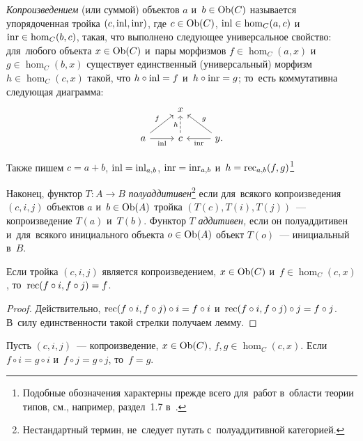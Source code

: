 \documentclass[a4paper,oneside]{article}
\newcommand{\notewrap}[1]{(#1)}
\begin{document}
\textit{Копроизведением} (или суммой) объектов $a$ и~$b \in \mathrm{Ob}(C)$ называется упорядоченная тройка $(c, \mathrm{inl}, \mathrm{inr})$,
где $c \in \mathrm{Ob}(C)$, $\mathrm{inl} \in \hom_C(a, c)$ и~$\mathrm{inr} \in \hom_C(b, c)$, такая, что
выполнено следующее универсальное свойство: для~любого объекта $x \in \mathrm{Ob}(C)$ и~пары морфизмов $f \in \hom_C(a, x)$
и~$g \in \hom_C(b, x)$ существует единственный (универсальный) морфизм $h \in \hom_C(c, x)$ такой, что $h \circ \mathrm{inl} = f$
и~$h \circ \mathrm{inr} = g$; то~есть коммутативна следующая диаграмма:
\[
  \begin{tikzcd}
    & x & \\ a \arrow{r}{}[swap]{\inl} \arrow{ur}{f} & \arrow[dashed]{u}{h} c & \arrow{l}{\inr}[swap]{} \arrow{ul}{}[swap]{g} y.
  \end{tikzcd}
\]

Также пишем $c = a + b$, $\mathrm{inl} = \mathrm{inl}_{a, b}$, $\mathrm{inr} = \mathrm{inr}_{a, b}$ и~$h = \mathrm{rec}_{a, b}(f, g)$\footnote{
  Подобные обозначения характерны прежде всего для~работ в~области теории типов, см., например, раздел~1.7 в~\cite{HoTTbook}.
  \vspace{7pt} %
}

Наконец, функтор $T : A \rightarrow B$ \textit{полуаддитивен}\rlap{\textit{,}}\footnote{
  Нестандартный термин, не~следует путать с~полуаддитивной категорией.
} если для~всякого копроизведения $(c, i, j)$ объектов $a$ и~$b \in \mathrm{Ob}(A)$
тройка $(T(c), T(i), T(j))$~— копроизведение $T(a)$ и~$T(b)$. Функтор $T$ \textit{аддитивен,} если он полуаддитивен и~для~всякого инициального объекта
$o \in \mathrm{Ob}(A)$ объект $T(o)$~— инициальный в~$B$.

\begin{lemma*}[\notewrap{$\eta$-правило}]
  Если тройка $(c, i, j)$ является копроизведением, $x \in \mathrm{Ob}(C)$
  и~$f \in \hom_C(c,\allowbreak x)$, то~$\mathrm{rec}(f \circ i, f \circ j) = f$.
\end{lemma*}

\begin{proof}
  Действительно, $\mathrm{rec}(f \circ i, f \circ j) \circ i = f \circ i$
  и~$\mathrm{rec}(f \circ i, f \circ j) \circ j = f \circ j$.
  В~силу единственности такой стрелки получаем лемму.
\end{proof}

\begin{lemma*}
  Пусть $(c, i, j)$~— копроизведение, $x \in \mathrm{Ob}(C)$, $f, g \in \hom_C(c, x)$.
  Если $f \circ i = g \circ i$ и~$f \circ j = g \circ j$, то~$f = g$.
\end{lemma*}
\end{document}
